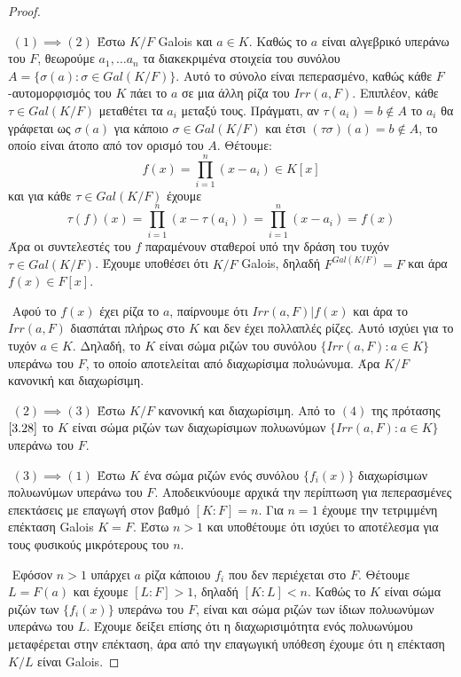 \documentclass[oneside,a4paper]{article}
\newcommand {\tl}{\textlatin}
\begin{document}
\begin{proof} $ $

	$ $\newline
	$(1)\implies (2)$ Έστω $K/F$ \tl{Galois} και $a\in K$. Καθώς το $a$ είναι αλγεβρικό υπεράνω του $F$, θεωρούμε $a_1, \ldots a_n$ τα διακεκριμένα στοιχεία του συνόλου $A = \{\sigma (a) : \sigma \in Gal(K/F)\}$. Αυτό το σύνολο είναι πεπερασμένο, καθώς κάθε $F$-αυτομορφισμός του $K$ πάει το $a$ σε μια άλλη ρίζα του $Irr(a,F)$. Επιπλέον, κάθε $\tau \in Gal(K/F)$ μεταθέτει τα $a_i$ μεταξύ τους. Πράγματι, αν $\tau(a_i) = b \not\in A$ το $a_i$ θα γράφεται ως $\sigma (a)$ για κάποιο $\sigma \in Gal(K/F)$ και έτσι $(\tau \sigma) (a) = b \not\in A$, το οποίο είναι άτοπο από τον ορισμό του $A$. Θέτουμε:
	$$f(x) = \prod\limits_{i=1}^n (x-a_i ) \in K[x]$$
	και για κάθε $\tau \in Gal(K/F)$ έχουμε
	$$\tau(f)(x) = \prod\limits_{i=1}^n (x-\tau(a_i)) = \prod\limits_{i=1}^n (x-a_i) = f(x)$$
	Άρα οι συντελεστές του $f$ παραμένουν σταθεροί υπό την δράση του τυχόν $\tau \in Gal(K/F)$. Έχουμε υποθέσει ότι $K/F$ \tl{Galois}, δηλαδή $F^{Gal(K/F)} = F$ και άρα $f(x) \in F[x]$.

	$ $\newline
	Αφού το $f(x)$ έχει ρίζα το $a$, παίρνουμε ότι $Irr(a,F)|f(x)$ και άρα το $Irr(a,F)$ διασπάται πλήρως στο $K$ και δεν έχει πολλαπλές ρίζες. Αυτό ισχύει για το τυχόν $a\in K$. Δηλαδή, το $K$ είναι σώμα ριζών του συνόλου $\{Irr(a,F) : a \in K\}$ υπεράνω του $F$, το οποίο αποτελείται από διαχωρίσιμα πολυώνυμα. Άρα $K/F$ κανονική και διαχωρίσιμη.

	$ $\newline
	\noindent $(2) \implies (3)$ Έστω $K/F$ κανονική και διαχωρίσιμη. Από το $(4)$ της πρότασης $\ref{3.28}$ το $K$ είναι σώμα ριζών των διαχωρίσιμων πολυωνύμων $\{Irr(a,F) : a \in K\}$ υπεράνω του $F$.

	$ $\newline
	\noindent $(3) \implies (1)$ Έστω $K$ ένα σώμα ριζών ενός συνόλου $\{f_i (x)\}$ διαχωρίσιμων πολυωνύμων υπεράνω του $F$. Αποδεικνύουμε αρχικά την περίπτωση για πεπερασμένες επεκτάσεις με επαγωγή στον βαθμό $[K:F] = n$. Για $n=1$ έχουμε την τετριμμένη επέκταση \tl{Galois} $K=F$. Έστω $n>1$ και υποθέτουμε ότι ισχύει το αποτέλεσμα για τους φυσικούς μικρότερους του $n$.
	
	$ $\newline
	Εφόσον $n>1$ υπάρχει $a$ ρίζα κάποιου $f_i$ που δεν περιέχεται στο $F$. Θέτουμε $L = F(a)$ και έχουμε $[L:F] > 1$, δηλαδή $[K:L] < n$. Καθώς το $K$ είναι σώμα ριζών των $\{f_i(x)\}$ υπεράνω του $F$, είναι και σώμα ριζών των ίδιων πολυωνύμων υπεράνω του $L$. Έχουμε δείξει επίσης ότι η διαχωρισιμότητα ενός πολυωνύμου μεταφέρεται στην επέκταση, άρα από την επαγωγική υπόθεση έχουμε ότι η επέκταση $K/L$ είναι \tl{Galois}.


\end{proof}
\end{document}
